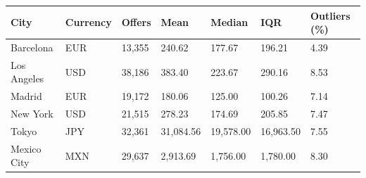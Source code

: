 \begin{tabular}{lllllll}
\toprule
City & Currency & Offers & Mean & Median & IQR & Outliers (\%) \\
\midrule
Barcelona & EUR & 13,355 & 240.62 & 177.67 & 196.21 & 4.39 \\
Los Angeles & USD & 38,186 & 383.40 & 223.67 & 290.16 & 8.53 \\
Madrid & EUR & 19,172 & 180.06 & 125.00 & 100.26 & 7.14 \\
New York & USD & 21,515 & 278.23 & 174.69 & 205.85 & 7.47 \\
Tokyo & JPY & 32,361 & 31,084.56 & 19,578.00 & 16,963.50 & 7.55 \\
Mexico City & MXN & 29,637 & 2,913.69 & 1,756.00 & 1,780.00 & 8.30 \\
\bottomrule
\end{tabular}

